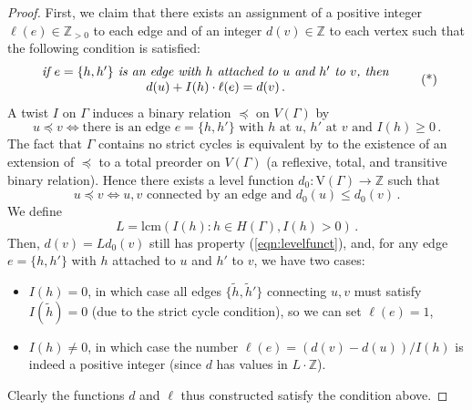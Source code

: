 \documentclass[a4paper,12pt]{article} %
\newcommand{\bb}[1]{{\mathbb{#1}}}
\def\V{\mathrm{V}}
\theoremstyle{definition}
\theoremstyle{plain}%
\begin{document}
\begin{proof}
First, we claim that there exists an assignment of a positive integer $\ell(e) \in \bb Z_{>0}$ to each edge and of an integer $d(v) \in \bb Z$ to each vertex such that the following condition is satisfied: 
  \begin{equation}
    \begin{array}{c}
         \text{\emph{if $e = \{ h, h'\}$ is an edge with $h$ attached to $u$ and $h'$ to $v$, then}} \\
          d(u) + I(h)\cdot \ell(e)  = d(v)\, .
    \end{array}\tag{*}
  \end{equation}
A twist $I$ on $\Gamma$ induces a binary relation $\preceq$ on $V(\Gamma)$ by 
\[u \preceq v \iff \text{there is an edge }e=\{h,h'\}\text{ with $h$ at $u$, $h'$ at $v$ and } I(h) \geq 0\, .\]
The fact that $\Gamma$ contains no strict cycles is equivalent by \cite{Suzumura1976Remarks-on-the-} to the existence of an extension of $\preceq$ to a total preorder on $V(\Gamma)$ (a reflexive, total, and transitive binary relation). Hence there exists a level function $d_0 : \V(\Gamma) \to \mathbb{Z}$ such that 
\begin{equation} \label{eqn:levelfunct} u \preceq v \iff u, v\text{ connected by an edge and }d_0(u) \leq d_0(v)\, .\end{equation}
We define
\[L = \mathrm{lcm}(I(h) : h \in H(\Gamma), I(h) > 0)\, .\]
Then, $d(v) = L d_0(v)$ still has property (\ref{eqn:levelfunct}), and,
for any edge $e = \{ h, h'\}$  with $h$ attached to $u$ and $h'$ to $v$, we have two cases:
\begin{itemize}
    \item $I(h) = 0$, in which case all edges $\{\tilde h, \tilde h'\}$ connecting $u,v$ must satisfy $I(\tilde h)=0$ (due to the strict cycle condition), so we can set $\ell(e)=1$,
    \item $I(h) \neq 0$, in which case the number $\ell(e) = (d(v) - d(u))/I(h)$ is indeed a positive integer (since $d$ has values in $L \cdot \mathbb{Z}$).
\end{itemize}
Clearly the functions $d$ and $\ell$ thus constructed satisfy the condition above.


\end{proof}
\end{document}

